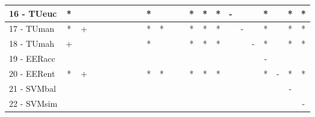 \begin{table}[h]
\begin{center}
\begin{tabular}{lcc|cc|cc|cc|cc|cc|cc|cc|cc|cc|cc}
16 - TUeuc	& * &   &   &   &   &   &   &   & * &   &   &   & * & * & * & - &   &   & * &   & * & * \\ \hline
17 - TUman	& * & + &   &   &   &   &   &   & * & * &   &   & * & * & * &   & - &   & * &   & * & * \\
18 - TUmah	& + &   &   &   &   &   &   &   & * &   &   &   & * & * & * &   &   & - & * &   & * & * \\ \hline
19 - EERacc	&   &   &   &   &   &   &   &   &   &   &   &   &   &   &   &   &   &   & - &   &   &   \\
20 - EERent	& * & + &   &   &   &   &   &   & * & * &   &   & * & * & * &   &   &   & * & - & * & * \\ \hline
21 - SVMbal	&   &   &   &   &   &   &   &   &   &   &   &   &   &   &   &   &   &   &   &   & - &   \\
22 - SVMsim	&   &   &   &   &   &   &   &   &   &   &   &   &   &   &   &   &   &   &   &   &   & - \\ \hline\end{tabular}
\label{stratsfried5NN}
\end{center}
\end{table}